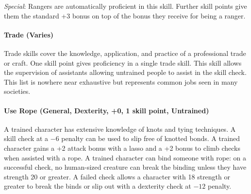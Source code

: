 \begin{multicols}{2}
\textit{Special}: Rangers are automatically proficient in this skill.  Further skill points give them the standard +3 bonus on top of the bonus they receive for being a ranger.

\paragraph{Trade (Varies)}

Trade skills cover the knowledge, application, and practice of a professional trade or craft.  One skill point gives proficiency in a single trade skill.  This skill allows the supervision of assistants allowing untrained people to assist in the skill check.  This list is nowhere near exhaustive but represents common jobs seen in many societies.

\paragraph{Use Rope (General, Dexterity, +0, 1 skill point, Untrained)}

A trained character has extensive knowledge of knots and tying techniques.  A skill check at a $-6$ penalty can be used to slip free of knotted bonds.  A trained character gains a +2 attack bonus with a lasso and a +2 bonus to climb checks when assisted with a rope.  A trained character can bind someone with rope: on a successful check, no human-sized creature can break the binding unless they have strength 20 or greater.  A failed check allows a character with 18 strength or greater to break the binds or slip out with a dexterity check at $-12$ penalty.

\end{multicols}

